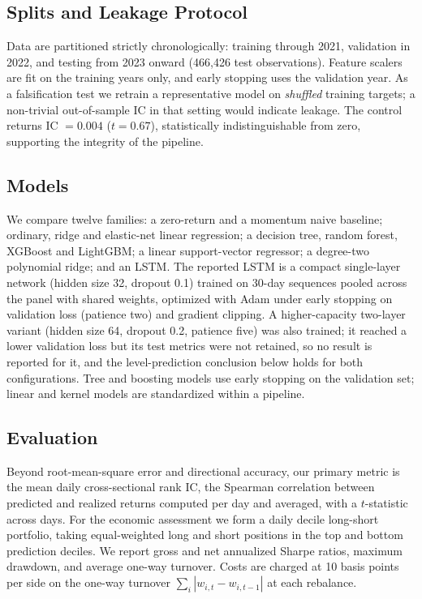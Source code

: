 \documentclass[conference]{IEEEtran}
\begin{document}
\subsection{Splits and Leakage Protocol}
Data are partitioned strictly chronologically: training through 2021, validation
in 2022, and testing from 2023 onward (466{,}426 test observations). Feature scalers are fit on the training years only, and early stopping uses the validation year. As a
falsification test we retrain a representative model on \emph{shuffled} training
targets; a non-trivial out-of-sample IC in that setting would indicate leakage. The
control returns IC $=0.004$ ($t=0.67$), statistically indistinguishable from zero,
supporting the integrity of the pipeline.

\subsection{Models}
We compare twelve families: a zero-return and a momentum naive baseline; ordinary,
ridge and elastic-net linear regression; a decision tree, random forest, XGBoost
and LightGBM; a linear support-vector regressor; a degree-two polynomial ridge; and
an LSTM. The reported LSTM is a compact single-layer network (hidden size 32,
dropout 0.1) trained on 30-day sequences pooled across the panel with shared
weights, optimized with Adam under early stopping on validation loss (patience
two) and gradient clipping. A higher-capacity two-layer variant (hidden size 64,
dropout 0.2, patience five) was also trained; it reached a lower validation loss
but its test metrics were not retained, so no result is reported for it, and the
level-prediction conclusion below holds for both configurations. Tree and boosting
models use early stopping on the validation set; linear and kernel models are
standardized within a pipeline.

\subsection{Evaluation}
Beyond root-mean-square error and directional accuracy, our primary metric is the
mean daily cross-sectional rank IC, the Spearman correlation between predicted and
realized returns computed per day and averaged, with a $t$-statistic across days.
For the economic assessment we form a daily decile long-short portfolio, taking
equal-weighted long and short positions in the top and bottom prediction deciles.
We report gross and net annualized Sharpe ratios, maximum drawdown, and average
one-way turnover. Costs are charged at 10 basis points per side on the one-way
turnover $\sum_i |w_{i,t}-w_{i,t-1}|$ at each rebalance.
\end{document}
